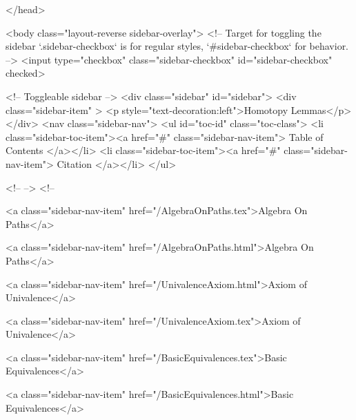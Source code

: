   
</head>




  <body class="layout-reverse sidebar-overlay">
    <!-- Target for toggling the sidebar `.sidebar-checkbox` is for regular
     styles, `#sidebar-checkbox` for behavior. -->
<input type="checkbox" class="sidebar-checkbox" id="sidebar-checkbox" checked>

<!-- Toggleable sidebar -->
<div class="sidebar" id="sidebar">
  <div class="sidebar-item" >
    <p style="text-decoration:left">Homotopy Lemmas</p>
  </div>
  <nav class="sidebar-nav">
    <ul id="toc-id" class="toc-class">
  <li class="sidebar-toc-item"><a href="#" class="sidebar-nav-item"> Table of Contents </a></li>
  <li class="sidebar-toc-item"><a href="#" class="sidebar-nav-item"> Citation </a></li>
</ul>


    <!--  -->
    <!-- 
      
    
      
    
      
    
      
    
      
        
      
    
      
        
          <a class="sidebar-nav-item" href="/AlgebraOnPaths.tex">Algebra On Paths</a>
        
      
    
      
        
          <a class="sidebar-nav-item" href="/AlgebraOnPaths.html">Algebra On Paths</a>
        
      
    
      
        
          <a class="sidebar-nav-item" href="/UnivalenceAxiom.html">Axiom of Univalence</a>
        
      
    
      
        
          <a class="sidebar-nav-item" href="/UnivalenceAxiom.tex">Axiom of Univalence</a>
        
      
    
      
        
          <a class="sidebar-nav-item" href="/BasicEquivalences.tex">Basic Equivalences</a>
        
      
    
      
        
          <a class="sidebar-nav-item" href="/BasicEquivalences.html">Basic Equivalences</a>
        
